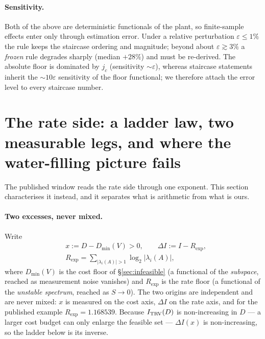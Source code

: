 \documentclass[journal]{IEEEtran}
\theoremstyle{remark}
\begin{document}
\paragraph{Sensitivity.} Both of the above are deterministic functionals of the
plant, so finite-sample effects enter only through estimation error. Under a
relative perturbation $\varepsilon\le1\%$ the rule keeps the staircase ordering and
magnitude; beyond about $\varepsilon\gtrsim3\%$ a \emph{frozen} rule degrades
sharply (median $+28\%$) and must be re-derived. The absolute floor is dominated
by $j_c$ (sensitivity $\sim\varepsilon$), whereas staircase statements inherit the
$\sim10\varepsilon$ sensitivity of the floor functional; we therefore attach the
error level to every staircase number.
\section{The rate side: a ladder law, two measurable legs, and where the water-filling picture fails}\label{sec:rate}

The published window reads the rate side through one exponent. This section
characterises it instead, and it separates what is arithmetic from what is ours.

\paragraph{Two excesses, never mixed.} Write
\begin{equation}
  \begin{aligned}
  &x:=D-D_{\min}(V)>0,\qquad \Delta I:=I-R_{\exp},\\
  &R_{\exp}=\sum_{|\lambda_i(A)|>1}\log_2|\lambda_i(A)|,
  \end{aligned}
  \label{eq:excess}
\end{equation}
where $D_{\min}(V)$ is the cost floor of \S\ref{sec:infeasible} (a functional of
the \emph{subspace}, reached as measurement noise vanishes) and $R_{\exp}$ is the
rate floor (a functional of the \emph{unstable spectrum}, reached as $S\to0$).
The two origins are independent and are never mixed: $x$ is measured on the cost
axis, $\Delta I$ on the rate axis, and for the published example
$R_{\exp}=1.168539$. Because $I_{\rm TRV}(D)$ is non-increasing in $D$ --- a larger
cost budget can only enlarge the feasible set --- $\Delta I(x)$ is non-increasing,
so the ladder below is its inverse.
\end{document}
